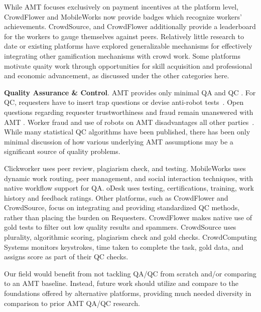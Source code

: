 \documentclass{sigchi}
\begin{document}
While AMT focuses exclusively on payment incentives at the platform level, CrowdFlower and MobileWorks now provide badges which recognize workers' achievements. CrowdSource, and CrowdFlower additionally provide a leaderboard for the workers to gauge themselves against peers. Relatively little research to date or existing platforms have explored generalizable mechanisms for effectively integrating other gamification mechanisms with crowd work. Some platforms motivate quaity work through opportunities for skill acquisition and professional and economic advancement, as discussed under the other categories here. 


{\bf Quality Assurance \& Control}. AMT provides only minimal QA and QC 
\cite{Ipeirotis:Wang:2010,dow2012shepherding}. For QC, requesters have to insert trap questions or devise anti-robot tests~\cite{negri2010creating,zhu10,sanderson2010user}. Open questions regarding requester trustworthiness and fraud remain unanswered with AMT \cite{panos2010pleatoamazon,tn-avoid}. Worker fraud and use of robots on AMT disadvantages all other parties~\cite{levine2006survey,Kittur08,downs2010your,heymann2011turkalytics,difallah2012mechanical,raykar2012eliminating,Eickhoff13}. While many statistical QC algorithms have been published, there has been only minimal discussion of how various underlying AMT assumptions may be a significant source of quality problems.

Clickworker uses peer review, plagiarism check, and testing. MobileWorks uses dynamic work routing, peer management, and social interaction techniques, with native workflow support for QA. oDesk uses testing, certifications, training, work history and feedback ratings. Other platforms, such as CrowdFlower and CrowdSource, focus on integrating and providing standardized QC methods, rather than placing the burden on Requesters. CrowdFlower makes native use of gold tests to filter out low quality results and spammers. CrowdSource uses plurality, algorithmic scoring, plagiarism check and gold checks. CrowdComputing Systems monitors keystrokes, time taken to complete the task, gold data, and assigns score as part of their QC checks. 

Our field would benefit from not tackling QA/QC from scratch and/or comparing to an AMT baseline. Instead, future work should utilize and compare to the foundations offered by alternative platforms, providing much needed diversity in comparison to prior AMT QA/QC research.
\end{document}
